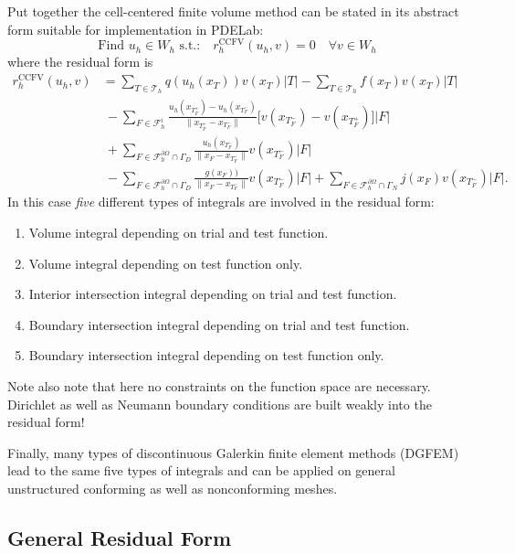 \documentclass[a4paper,12pt]{article}
\begin{document}
Put together the cell-centered finite volume method can be stated 
in its abstract form suitable for implementation in PDELab:
\begin{equation}
\boxed{ \text{Find $u_h\in W_h$ s.t.:} \quad r_h^{\text{CCFV}}(u_h,v) = 0 \quad \forall v \in W_h }
\end{equation}
where the residual form is
\begin{equation}
\label{eq:res_form_final}
\begin{split}
r_h^{\text{CCFV}}(u_h,v) 
& = \sum_{T\in\mathcal{T}_h} q(u_h(x_T)) v(x_T) |T|
- \sum_{T\in\mathcal{T}_h} f(x_T) v(x_T) |T|\\
&\ - \sum_{F\in\mathcal{F}_h^i} 
\frac{u_h(x_{T_F^+})-u_h(x_{T_F^-})}{\|x_{T_F^+} - x_{T_F^-}\|}
\bigl[v(x_{T_F^-}) - v(x_{T_F^+})\bigr] |F|\\
&\ + \sum_{F\in\mathcal{F}_h^{\partial\Omega}\cap\Gamma_D} 
\frac{u_h(x_{T_F^-})}{\|x_{F} - x_{T_F^-}\|} v(x_{T_F^-}) |F| \\
&\ - \sum_{F\in\mathcal{F}_h^{\partial\Omega}\cap\Gamma_D} 
\frac{g(x_{F}))}{\|x_{F} - x_{T_F^-}\|} v(x_{T_F^-}) |F|
+ \sum_{F\in\mathcal{F}_h^{\partial\Omega}\cap\Gamma_N} j(x_{F}) v(x_{T_F^-}) |F| .
\end{split}
\end{equation}
In this case \textit{five} different types of integrals are involved in the 
residual form:
\begin{enumerate}
\item Volume integral depending on trial and test function.
\item Volume integral depending on test function only.
\item Interior intersection integral depending on trial and test function.
\item Boundary intersection integral depending on trial and test function.
\item Boundary intersection integral depending on test function only.
\end{enumerate}
Note also note that here no constraints on the function space are necessary.
Dirichlet as well as Neumann boundary conditions are built weakly into the
residual form!

Finally, many types of discontinuous Galerkin finite element methods (DGFEM) 
lead to the same five types of integrals and can be applied on general unstructured
conforming as well as nonconforming meshes.

\subsection*{General Residual Form}
\end{document}
